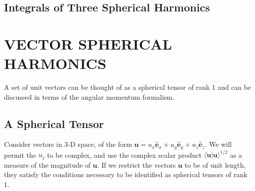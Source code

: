 \documentclass[12pt,a4paper]{article}
\renewcommand{\vec}[1]{\boldsymbol{#1}}
\begin{document}
\subsection{Integrals of Three Spherical Harmonics}


































\section{VECTOR SPHERICAL HARMONICS}
\cite{arfken} A set of unit vectors can be thought of as a spherical tensor of rank $1$ and can be discussed in terms of the angular momentum formalism.

\subsection{A Spherical Tensor}
Consider vectors in $3$-D space, of the form $\vec{u} = u_x \vec{\hat{e}}_x + u_y \vec{\hat{e}}_y + u_z \vec{\hat{e}}_z$. We will permit the $u_j$ to be complex, and use the complex scalar product $\langle \vec{u}|\vec{u}\rangle^{1/2}$ as a measure of the magnitude of $\vec{u}$. If we restrict the vectors $\vec{u}$ to be of unit length, they satisfy the conditions necessary to be identified as spherical tensors of rank $1$.
\end{document}
